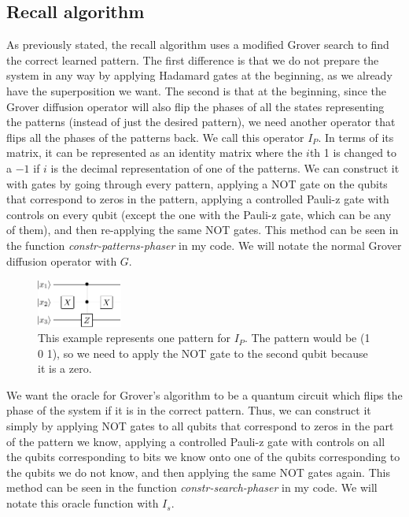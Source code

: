\documentclass[11pt]{report}
\newcommand{\?}{\stackrel{?}{=}}
\begin{document}
\newpage

\subsection{Recall algorithm}

As previously stated, the recall algorithm uses a modified Grover search to find the correct learned pattern. The first difference is that we do not prepare the system in any way by applying Hadamard gates at the beginning, as we already have the superposition we want. The second is that at the beginning, since the Grover diffusion operator will also flip the phases of all the states representing the patterns (instead of just the desired pattern), we need another operator that flips all the phases of the patterns back. We call this operator $I_P$. In terms of its matrix, it can be represented as an identity matrix where the $i$th 1 is changed to a $-1$ if $i$ is the decimal representation of one of the patterns. We can construct it with gates by going through every pattern, applying a NOT gate on the qubits that correspond to zeros in the pattern, applying a controlled Pauli-z gate with controls on every qubit (except the one with the Pauli-z gate, which can be any of them), and then re-applying the same NOT gates. This method can be seen in the function \textit{constr-patterns-phaser} in my code. We will notate the normal Grover diffusion operator with $G$.

\begin{figure}[!htb]
\centering
\includegraphics[width=0.25\textwidth]{resources/pdfs/assoc2-crop.pdf}
\caption{This example represents one pattern for $I_P$. The pattern would be (1 0 1), so we need to apply the NOT gate to the second qubit because it is a zero.}
\label{fig:digraph2}
\end{figure}

We want the oracle for Grover's algorithm to be a quantum circuit which flips the phase of the system if it is in the correct pattern. Thus, we can construct it simply by applying NOT gates to all qubits that correspond to zeros in the part of the pattern we know, applying a controlled Pauli-z gate with controls on all the qubits corresponding to bits we know onto one of the qubits corresponding to the qubits we do not know, and then applying the same NOT gates again. This method can be seen in the function \textit{constr-search-phaser} in my code. We will notate this oracle function with $I_s$.
\end{document}
